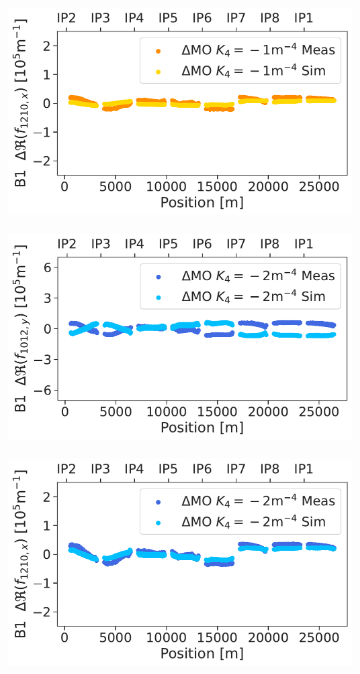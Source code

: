 \begin{figure}[!htb]
\begin{subfigure}{0.47\textwidth}
        \includegraphics[width=\textwidth]{./images/skew_octupoles/responses_coupling/f1210_response_meas_sim_-1_REAL_smoll.pdf}
    \end{subfigure}
    \par\medskip
    \begin{subfigure}{0.47\textwidth}
        \includegraphics[width=\textwidth]{./images/skew_octupoles/responses_coupling/f1012_response_meas_sim_-2_REAL_smoll.pdf}
    \end{subfigure}
    \hfill
    \begin{subfigure}{0.47\textwidth}
        \includegraphics[width=\textwidth]{./images/skew_octupoles/responses_coupling/f1210_response_meas_sim_-2_REAL_smoll.pdf}

\end{subfigure}
\end{figure}
